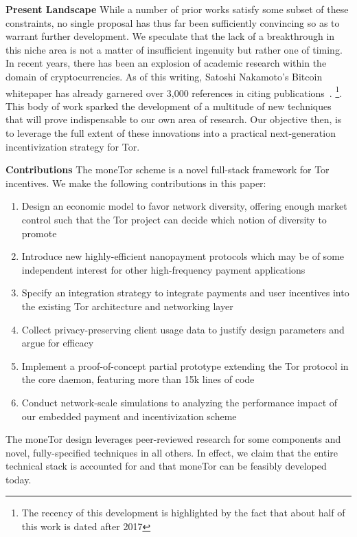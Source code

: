 \textbf{Present Landscape} While a number of prior works satisfy some subset of
these constraints, no single proposal has thus far been sufficiently convincing
so as to warrant further development. We speculate that the lack of a
breakthrough in this niche area is not a matter of insufficient ingenuity but
rather one of timing. In recent years, there has been an explosion of academic
research within the domain of cryptocurrencies. As of this writing, Satoshi
Nakamoto's Bitcoin whitepaper has already garnered over 3,000 references in
citing publications~\cite{nakamoto2008bitcoin}.
\footnote{The recency of this
  development is highlighted by the fact that about half of this work is dated
  after 2017}.
This body of work sparked the development of a multitude of new techniques that
will prove indispensable to our own area of research. Our objective then, is to
leverage the full extent of these innovations into a practical next-generation
incentivization strategy for Tor.

\label{sec:Contributions}
\textbf{Contributions} The moneTor scheme is a novel full-stack framework for
Tor incentives. We make the following contributions in this paper:

\begin{enumerate}
\item Design an economic model to favor network diversity, offering enough
  market control such that the Tor project can decide which notion of diversity
  to promote
\item Introduce new highly-efficient nanopayment protocols which may be of some
  independent interest for other high-frequency payment applications
\item Specify an integration strategy to integrate payments and user incentives
  into the existing Tor architecture and networking layer
\item Collect privacy-preserving client usage data to justify design parameters
  and argue for efficacy
\item Implement a proof-of-concept partial prototype extending the Tor protocol
  in the core daemon, featuring more than 15k lines of code
\item Conduct network-scale simulations to analyzing the performance impact of
  our embedded payment and incentivization scheme
\end{enumerate}

The moneTor design leverages peer-reviewed research for some components and
novel, fully-specified techniques in all others. In effect, we claim that the
entire technical stack is accounted for and that moneTor can be feasibly
developed today.
